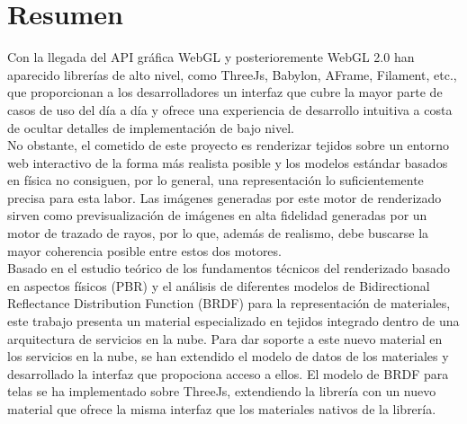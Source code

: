 \chapter{Resumen}

Con la llegada del API gr\'afica WebGL y posterioremente WebGL 2.0 han aparecido librer\'ias de alto nivel, como ThreeJs, Babylon,
AFrame, Filament, etc.,  que proporcionan a los desarrolladores un interfaz que cubre la mayor parte de casos de uso
del d\'ia a d\'ia y ofrece una experiencia de desarrollo intuitiva a costa de ocultar detalles de implementaci\'on de bajo nivel.\\

No obstante, el cometido de este proyecto es renderizar tejidos sobre un entorno web interactivo de la forma m\'as realista posible
y los modelos est\'andar basados en f\'isica no consiguen, por lo general, una representaci\'on lo suficientemente
precisa para esta labor. Las im\'agenes generadas por este motor de renderizado sirven como previsualizaci\'on de im\'agenes
en alta fidelidad generadas por un motor de trazado de rayos, por lo que, adem\'as de realismo, debe buscarse la mayor
coherencia posible entre estos dos motores.\\


Basado en el estudio te\'orico de los fundamentos t\'ecnicos del renderizado basado en aspectos f\'isicos (PBR) y el an\'alisis
de diferentes modelos de Bidirectional Reflectance Distribution Function (BRDF) para la representaci\'on de materiales,
este trabajo presenta un material especializado en tejidos integrado dentro de una arquitectura de servicios en la nube.
Para dar soporte a este nuevo material en los servicios en la nube, se han extendido el modelo de datos de los materiales
y desarrollado la interfaz que propociona acceso a ellos. El modelo de BRDF para telas se ha implementado sobre ThreeJs,
extendiendo la librer\'ia con un nuevo material que ofrece la misma interfaz que los materiales nativos de la librer\'ia.\\

